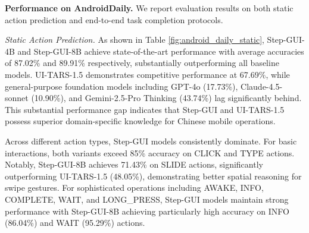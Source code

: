 \begin{table}[t]
\centering
\captionsetup{justification=justified, singlelinecheck=false}
\caption{Performance on AndroidDaily (End-to-End) Benchmark.}
\label{tab:ad_end-to-end}

\end{table}

\noindent\textbf{Performance on AndroidDaily.}
We report evaluation results on both static action prediction and end-to-end task completion protocols.

\noindent\textit{Static Action Prediction.}
As shown in Table \ref{fig:android_daily_static}, Step-GUI-4B and Step-GUI-8B achieve state-of-the-art performance with average accuracies of 87.02\% and 89.91\% respectively, substantially outperforming all baseline models. UI-TARS-1.5 demonstrates competitive performance at 67.69\%, while general-purpose foundation models including GPT-4o (17.73\%), Claude-4.5-sonnet (10.90\%), and Gemini-2.5-Pro Thinking (43.74\%) lag significantly behind. This substantial performance gap indicates that Step-GUI and UI-TARS-1.5 possess superior domain-specific knowledge for Chinese mobile operations.

Across different action types, Step-GUI models consistently dominate. For basic interactions, both variants exceed 85\% accuracy on CLICK and TYPE actions. Notably, Step-GUI-8B achieves 71.43\% on SLIDE actions, significantly outperforming UI-TARS-1.5 (48.05\%), demonstrating better spatial reasoning for swipe gestures. For sophisticated operations including AWAKE, INFO, COMPLETE, WAIT, and LONG\_PRESS, Step-GUI models maintain strong performance with Step-GUI-8B achieving particularly high accuracy on INFO (86.04\%) and WAIT (95.29\%) actions.

